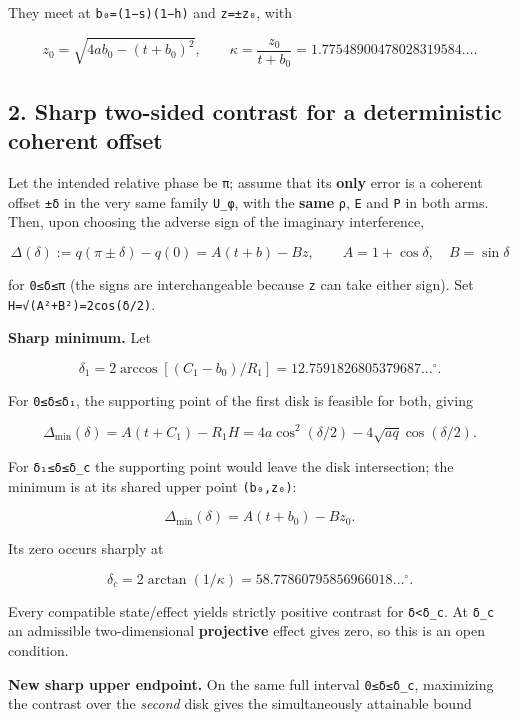 \documentclass[
  10pt,
  a4paper,
]{article}
\begin{document}
They meet at \texttt{b₀=(1−s)(1−h)} and \texttt{z=±z₀}, with

\[
 z_0=\sqrt{4ab_0-(t+b_0)^2},\qquad
 \kappa=\frac{z_0}{t+b_0}=1.77548900478028319584\ldots.
\]

\subsection{\texorpdfstring{2. Sharp \textbf{two-sided} contrast for a deterministic coherent offset}{2. Sharp two-sided contrast for a deterministic coherent offset}}\label{sharp-two-sided-contrast-for-a-deterministic-coherent-offset}

Let the intended relative phase be \texttt{π}; assume that its \textbf{only} error is a coherent offset \texttt{±δ} in the very same family \texttt{U\_φ}, with the \textbf{same} \texttt{ρ}, \texttt{E} and \texttt{P} in both arms. Then, upon choosing the adverse sign of the imaginary interference,

\[
 \Delta(\delta):=q(\pi\pm\delta)-q(0)
 =A(t+b)-Bz,\qquad A=1+\cos\delta,\quad B=\sin\delta
\]

for \texttt{0≤δ≤π} (the signs are interchangeable because \texttt{z} can take either sign). Set \texttt{H=√(A²+B²)=2cos(δ/2)}.

\textbf{Sharp minimum.} Let

\[
 \delta_1=2\arccos[(C_1-b_0)/R_1]=12.7591826805379687\ldots^\circ.
\]

For \texttt{0≤δ≤δ₁}, the supporting point of the first disk is feasible for both, giving

\[
 \Delta_{\min}(\delta)=A(t+C_1)-R_1H
 =4a\cos^2(\delta/2)-4\sqrt{aq}\cos(\delta/2).
\]

For \texttt{δ₁≤δ≤δ\_c} the supporting point would leave the disk intersection; the minimum is at its shared upper point \texttt{(b₀,z₀)}:

\[
 \Delta_{\min}(\delta)=A(t+b_0)-Bz_0.
\]

Its zero occurs sharply at

\[
 \delta_c=2\arctan(1/\kappa)=58.77860795856966018\ldots^\circ.
\]

Every compatible state/effect yields strictly positive contrast for \texttt{\textbar{}δ\textbar{}\textless{}δ\_c}. At \texttt{δ\_c} an admissible two-dimensional \textbf{projective} effect gives zero, so this is an open condition.

\textbf{New sharp upper endpoint.} On the same full interval \texttt{0≤δ≤δ\_c}, maximizing the contrast over the \emph{second} disk gives the simultaneously attainable bound
\end{document}
